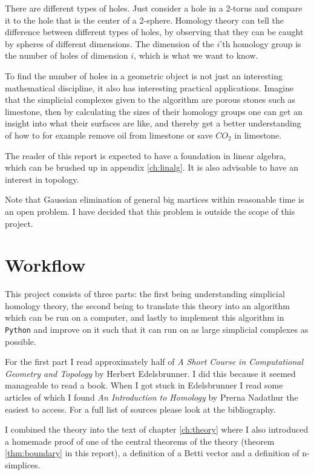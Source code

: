 \documentclass[11pt,a4paper,twoside, openright]{report}
\begin{document}
There are different types of holes. Just consider a hole in a 2-torus and compare it to the hole that is the center of a 2-sphere. Homology theory can tell the difference between different types of holes, by observing that they can be caught by spheres of different dimensions. The dimension of the $i$'th homology group is the number of holes of dimension $i$, which is what we want to know.

To find the number of holes in a geometric object is not just an interesting mathematical discipline, it also has interesting practical applications. Imagine that the simplicial complexes given to the algorithm are porous stones such as limestone, then by calculating the sizes of their homology groups one can get an insight into what their surfaces are like, and thereby get a better understanding of how to for example remove oil from limestone or save $CO_2$ in limestone. 

The reader of this report is expected to have a foundation in linear algebra, which can be brushed up in appendix \ref{ch:linalg}. It is also advisable to have an interest in topology.

Note that Gaussian elimination of general big martices within reasonable time is an open problem. I have decided that this problem is outside the scope of this project.
\newpage
\section*{Workflow}
This project consists of three parts: the first being understanding simplicial homology theory, the second being to translate this theory into an algorithm which can be run on a computer, and lastly to implement this algorithm in \texttt{Python} and improve on it such that it can run on as large simplicial complexes as possible.

For the first part I read approximately half of \emph{A Short Course in Computational Geometry and Topology} by Herbert Edelsbrunner\cite{Edelsbrunner}. I did this because it seemed manageable to read a book. When I got stuck in Edelsbrunner I read some articles of which I found \emph{An Introduction to Homology} by Prerna Nadathur \cite{Nadathur} the easiest to access. For a full list of sources please look at the bibliography.

I combined the theory into the text of chapter \ref{ch:theory} where I also introduced a homemade proof of one of the central theorems of the theory (theorem \ref{thm:boundary} in this report), a definition of a Betti vector and a definition of n-simplices.
\end{document}

